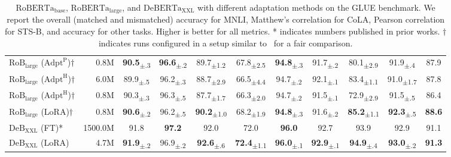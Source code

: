 \begin{table}[t!]
\begin{tabular}{l|r|ccccccccc}
  $\text{RoB}_\text{large}$ ($\text{Adpt}^{\text{P}}$)$\dagger$ & 0.8M & \textbf{90.5}\textsubscript{$\pm$.3} & \textbf{96.6}\textsubscript{$\pm$.2} & 89.7\textsubscript{$\pm$1.2} & 67.8\textsubscript{$\pm$2.5} & \textbf{94.8}\textsubscript{$\pm$.3} & 91.7\textsubscript{$\pm$.2} & 80.1\textsubscript{$\pm$2.9} & 91.9\textsubscript{$\pm$.4} & 87.9 \\
  $\text{RoB}_\text{large}$ ($\text{Adpt}^{\text{H}}$)$\dagger$ & 6.0M & 89.9\textsubscript{$\pm$.5} & 96.2\textsubscript{$\pm$.3} & 88.7\textsubscript{$\pm$2.9} & 66.5\textsubscript{$\pm$4.4} & 94.7\textsubscript{$\pm$.2} & 92.1\textsubscript{$\pm$.1} & 83.4\textsubscript{$\pm$1.1} & 91.0\textsubscript{$\pm$1.7} & 87.8 \\
  $\text{RoB}_\text{large}$ ($\text{Adpt}^{\text{H}}$)$\dagger$ & 0.8M & 90.3\textsubscript{$\pm$.3} & 96.3\textsubscript{$\pm$.5} & 87.7\textsubscript{$\pm$1.7} & 66.3\textsubscript{$\pm$2.0} & 94.7\textsubscript{$\pm$.2} & 91.5\textsubscript{$\pm$.1} & 72.9\textsubscript{$\pm$2.9} & 91.5\textsubscript{$\pm$.5} & 86.4 \\
  $\text{RoB}_\text{large}$ (LoRA)$\dagger$ & 0.8M & \textbf{90.6}\textsubscript{$\pm$.2} & 96.2\textsubscript{$\pm$.5} & \textbf{90.2}\textsubscript{$\pm$1.0} & 68.2\textsubscript{$\pm$1.9} & \textbf{94.8}\textsubscript{$\pm$.3} & 91.6\textsubscript{$\pm$.2} & \textbf{85.2}\textsubscript{$\pm$1.1} & \textbf{92.3}\textsubscript{$\pm$.5} & \textbf{88.6} \\
  \midrule
  $\text{DeB}_\text{XXL}$ (FT)* & 1500.0M & 91.8 & \textbf{97.2} & 92.0 & 72.0 & \textbf{96.0} & 92.7 & 93.9 & 92.9 & 91.1 \\
  $\text{DeB}_\text{XXL}$ (LoRA) & 4.7M & \textbf{91.9}\textsubscript{$\pm$.2} & 96.9\textsubscript{$\pm$.2} & \textbf{92.6}\textsubscript{$\pm$.6} & \textbf{72.4}\textsubscript{$\pm$1.1} & \textbf{96.0}\textsubscript{$\pm$.1} & \textbf{92.9}\textsubscript{$\pm$.1} & \textbf{94.9}\textsubscript{$\pm$.4} & \textbf{93.0}\textsubscript{$\pm$.2} & \textbf{91.3} \\
  \bottomrule
  \end{tabular}
  \caption{$\text{RoBERTa}_{\text{base}}$, $\text{RoBERTa}_{\text{large}}$, and $\text{DeBERTa}_{\text{XXL}}$ with different adaptation methods on the GLUE benchmark. We report the overall (matched and mismatched) accuracy for MNLI, Matthew's correlation for CoLA, Pearson correlation for STS-B, and accuracy for other tasks. Higher is better for all metrics. * indicates numbers published in prior works. $\dagger$ indicates runs configured in a setup similar to~\cite{houlsby_parameter-efficient_2019} for a fair comparison.
  }
  \label{tab:NLU_results}
\end{table}
